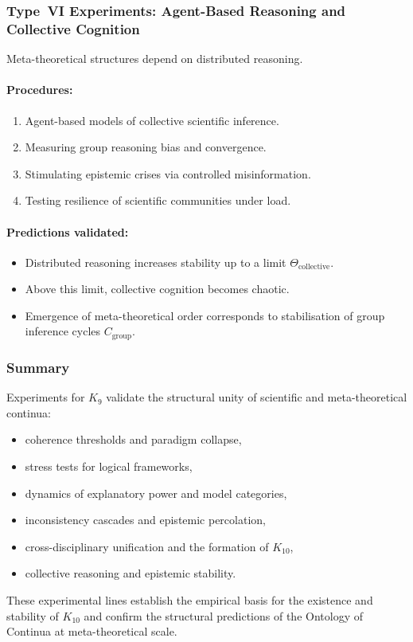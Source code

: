 \subsubsection{Type~VI Experiments: Agent-Based Reasoning and Collective Cognition}

Meta-theoretical structures depend on distributed reasoning.

\paragraph{Procedures:}

\begin{enumerate}
    \item Agent-based models of collective scientific inference.
    \item Measuring group reasoning bias and convergence.
    \item Stimulating epistemic crises via controlled misinformation.
    \item Testing resilience of scientific communities under load.
\end{enumerate}

\paragraph{Predictions validated:}

\begin{itemize}
    \item Distributed reasoning increases stability up to a limit 
          $\Theta_{\mathrm{collective}}$.
    \item Above this limit, collective cognition becomes chaotic.
    \item Emergence of meta-theoretical order corresponds to stabilisation
          of group inference cycles $C_{\mathrm{group}}$.
\end{itemize}



\subsubsection{Summary}

Experiments for $K_9$ validate the structural unity of scientific and
meta-theoretical continua:

\begin{itemize}
    \item coherence thresholds and paradigm collapse,
    \item stress tests for logical frameworks,
    \item dynamics of explanatory power and model categories,
    \item inconsistency cascades and epistemic percolation,
    \item cross-disciplinary unification and the formation of $K_{10}$,
    \item collective reasoning and epistemic stability.
\end{itemize}

These experimental lines establish the empirical basis for the 
existence and stability of $K_{10}$ and confirm the structural 
predictions of the Ontology of Continua at meta-theoretical scale.
